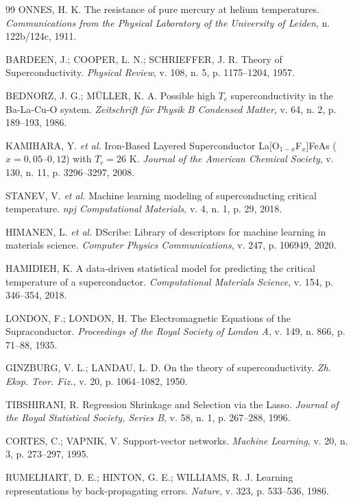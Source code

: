 \documentclass[12pt, a4paper, oneside]{report}
\begin{document}
\begin{thebibliography}{99}
 ONNES, H. K. The resistance of pure mercury at helium temperatures. \textit{Communications from the Physical Laboratory of the University of Leiden}, n. 122b/124c, 1911.

 BARDEEN, J.; COOPER, L. N.; SCHRIEFFER, J. R. Theory of Superconductivity. \textit{Physical Review}, v. 108, n. 5, p. 1175--1204, 1957.

 BEDNORZ, J. G.; MÜLLER, K. A. Possible high $T_c$ superconductivity in the Ba-La-Cu-O system. \textit{Zeitschrift für Physik B Condensed Matter}, v. 64, n. 2, p. 189--193, 1986.

 KAMIHARA, Y. \textit{et al.} Iron-Based Layered Superconductor La[O$_{1-x}$F$_x$]FeAs ($x = 0{,}05$--$0{,}12$) with $T_c = 26$ K. \textit{Journal of the American Chemical Society}, v. 130, n. 11, p. 3296--3297, 2008.

 STANEV, V. \textit{et al.} Machine learning modeling of superconducting critical temperature. \textit{npj Computational Materials}, v. 4, n. 1, p. 29, 2018.

 HIMANEN, L. \textit{et al.} DScribe: Library of descriptors for machine learning in materials science. \textit{Computer Physics Communications}, v. 247, p. 106949, 2020.

 HAMIDIEH, K. A data-driven statistical model for predicting the critical temperature of a superconductor. \textit{Computational Materials Science}, v. 154, p. 346--354, 2018.

 LONDON, F.; LONDON, H. The Electromagnetic Equations of the Supraconductor. \textit{Proceedings of the Royal Society of London A}, v. 149, n. 866, p. 71--88, 1935.

 GINZBURG, V. L.; LANDAU, L. D. On the theory of superconductivity. \textit{Zh. Eksp. Teor. Fiz.}, v. 20, p. 1064--1082, 1950.

 TIBSHIRANI, R. Regression Shrinkage and Selection via the Lasso. \textit{Journal of the Royal Statistical Society, Series B}, v. 58, n. 1, p. 267--288, 1996.

 CORTES, C.; VAPNIK, V. Support-vector networks. \textit{Machine Learning}, v. 20, n. 3, p. 273--297, 1995.

 RUMELHART, D. E.; HINTON, G. E.; WILLIAMS, R. J. Learning representations by back-propagating errors. \textit{Nature}, v. 323, p. 533--536, 1986.


\end{thebibliography}
\end{document}
